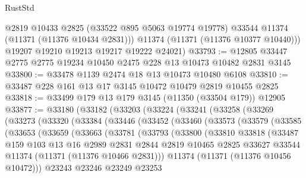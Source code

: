 \begin{lexlean}{RustStd}
\begin{coremodule}
          @2819
          @10433
          @2825
          (@33522 @895 @5063 @19774 @19778)
          @33544
          @11374
          (@11371 (@11376 @10434 @2831)))
        @11374
        (@11371 (@11376 @10377 @10440)))
      @19207
      @19210
      @19213
      @19217
      @19222
      @24021)
@33793 := @12805 @33447 @2775 @2775 @19234 @10450 @2475 @228 @13 @10473 @10482 @2831 @3145
@33800 := @33478 @1139 @2474 @18 @13 @10473 @10480 @6108
@33810 := @33487 @228 @161 @13 @17 @3145 @10472 @10479 @2819 @10455 @2825
@33818 := @33499 @179 @13 @179 @3145 (@11350 (@33504 @179)) @12905
@33877 := @33180
    (@33182
      (@33203
        (@33224
          (@33241
            (@33258
              (@33269
                (@33273
                  (@33320
                    (@33384
                      (@33446
                        (@33452
                          (@33460
                            (@33573
                              (@33579
                                (@33585
                                  (@33653
                                    (@33659
                                      (@33663
                                        (@33781
                                          (@33793
                                            (@33800
                                              (@33810
                                                @33818
                                                (@33487
                                                  @159
                                                  @103
                                                  @13
                                                  @16
                                                  @2989
                                                  @2831
                                                  @2844
                                                  @2819
                                                  @10465
                                                  @2825
                                                  @33627
                                                  @33544
                                                  @11374
                                                  (@11371 (@11376 @10466 @2831)))
                                                @11374
                                                (@11371 (@11376 @10456 @10472)))
                                              @23243
                                              @23246
                                              @23249
                                              @23253

\end{coremodule}
\end{lexlean}
